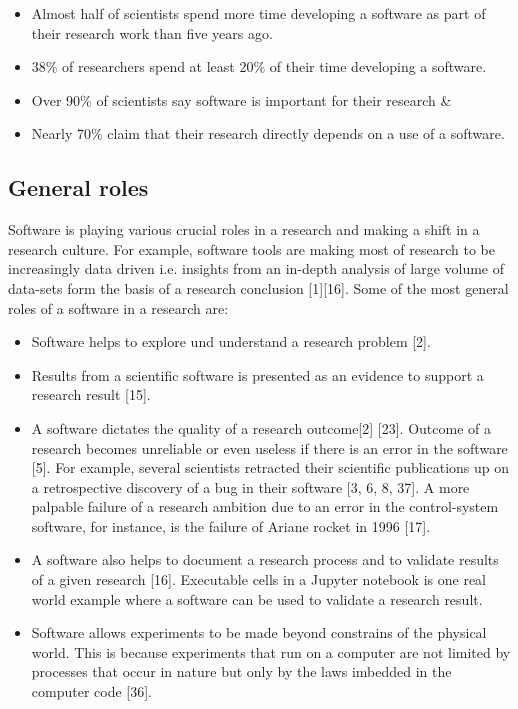 \begin{itemize}[noitemsep,topsep=5pt, leftmargin=0.3in] %
	\item Almost half of scientists spend more time developing a software as part of their research work than five years ago.
	\item 38\% of researchers spend at least 20\% of their time developing a software.
	\item Over 90\% of scientists say software is important for their research \&
	\item Nearly 70\% claim that their research directly depends on a use of a software.  

\end{itemize}

\subsection{General roles}

Software is playing various crucial roles in a research and making a shift in a research culture. For example, software tools are making most of research to be increasingly data driven i.e. insights from an in-depth analysis of large volume of data-sets form the basis of a research conclusion [1][16]. Some of the most general roles of a software in a research are:

\begin{itemize}[noitemsep,topsep=5pt, leftmargin=0.5in] %

	\item Software helps to explore und understand a research problem [2].
	\item Results from a scientific software is presented as an evidence to support a research result [15]. 
	\item A software dictates the quality of a research outcome[2] [23]. Outcome of a research becomes unreliable or even useless if there is an error in the software [5]. For example, several scientists retracted their scientific publications up on a retrospective discovery of a bug in their software [3, 6, 8, 37]. A more palpable failure of a research ambition due to an error in the control-system software, for instance, is the failure of Ariane rocket in 1996 [17].  
	\item A software also helps to document a research process and to validate results of a given research [16]. Executable cells in a Jupyter notebook is one real world example where a software can be used to validate a research result.
	\item Software allows experiments to be made beyond constrains of the physical world. This is because experiments that run on a computer are not limited by processes that occur in nature but only by the laws imbedded in the computer code [36]. 

\end{itemize}


